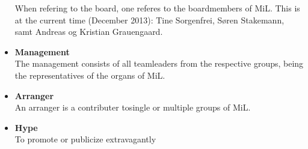 \begin{itemize}
	When refering to the board, one referes to the boardmembers of MiL. This is at the current time (December 2013): Tine Sorgenfrei, Søren Stakemann, samt Andreas og Kristian Grauengaard.
	\item \textbf{Management}\\
	The management consists of all teamleaders from the respective groups, being the representatives of the organs of MiL.
	\item \textbf{Arranger}\\
	An arranger is a contributer tosingle or multiple groups of MiL.
	\item \textbf{Hype}\\
	To promote or publicize extravagantly

\end{itemize}